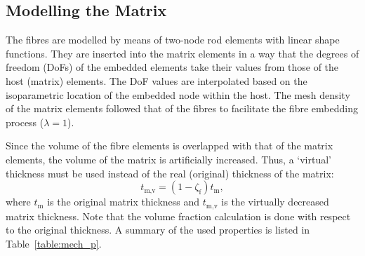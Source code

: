 \subsection{Modelling the Matrix}
   	The fibres are modelled by means of two-node rod elements with linear shape functions. They are inserted into the matrix elements in a way that the degrees of freedom (DoFs) of the embedded elements take their values from those of the host (matrix) elements. The DoF values are interpolated based on the isoparametric location of the embedded node within the host. The mesh density of the matrix elements followed that of the fibres to facilitate the fibre embedding process ($\lambda=1$).
   	
   	Since the volume of the fibre elements is overlapped with that of the matrix elements, the volume of the matrix is artificially increased. Thus, a `virtual' thickness must be used instead of the real (original) thickness of the matrix:
   	\begin{equation}
   		t_\text{m,v}=(1-\zeta_\text{f})t_\text{m},
   	\end{equation}
   	where $t_\text{m}$ is the original matrix thickness and $t_\text{m,v}$ is the virtually decreased matrix thickness. Note that the volume fraction calculation is done with respect to the original thickness. A summary of the used properties is listed in Table~\ref{table:mech_p}. 
	
